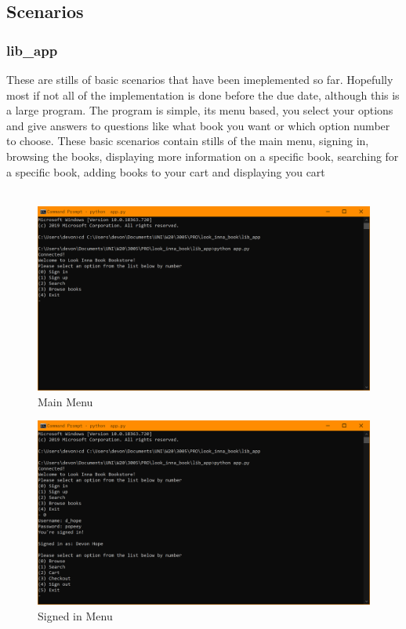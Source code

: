 \documentclass[a4 paper]{article}
\begin{document}
\subsection{Scenarios}
\subsubsection{lib\_app}
These are stills of basic scenarios that have been imeplemented so far. Hopefully most if not all of the implementation is done before the due date, although this is a large program. The program is simple, its menu based, you select your options  and give answers to questions like what book you want or which option number to choose. These basic scenarios contain stills of the main menu, signing in, browsing the books, displaying more information on a specific book, searching for a specific book, adding books to your cart and displaying you cart\\\\
\begin{figure}
\centering 
\includegraphics[width=\textwidth/1]{scenarios_cmd/Main_menu.png} 
\caption{Main Menu}
\end{figure}
\begin{figure}
\centering 
\includegraphics[width=\textwidth/1]{scenarios_cmd/signed_in_menu.png}
\caption{Signed in Menu}
\end{figure}
\end{document}
